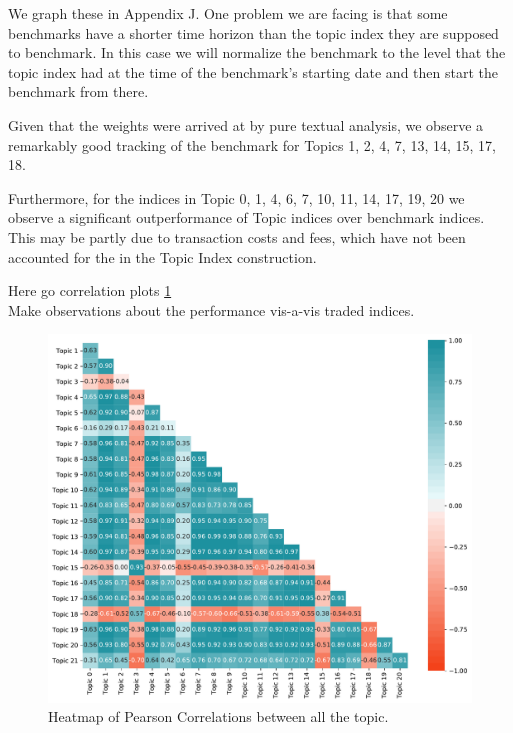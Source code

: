 \documentclass[12pt,journal,letterpaper,oneside,onecolumn]{IEEEtran}
\begin{document}
We graph these in Appendix J. One problem we are facing is that some benchmarks have a shorter time horizon than the topic index they are supposed to benchmark. In this case we will normalize the benchmark to the level that the topic index had at the time of the benchmark's starting date and then start the benchmark from there.

Given that the weights were arrived at by pure textual analysis, we observe a remarkably good tracking of the benchmark for Topics 1, 2, 4, 7, 13, 14, 15, 17, 18. 

Furthermore, for the indices in Topic 0, 1, 4, 6, 7, 10, 11, 14, 17, 19, 20 we observe a significant outperformance of Topic indices over benchmark indices. This may be partly due to transaction costs and fees, which have not been accounted for the in the Topic Index construction.

Here go correlation plots \ref{fig:correlation_dig_topics}\\

Make observations about the performance vis-a-vis traded indices.

\begin{figure}
    \centering
	\includegraphics[width=0.9\linewidth]{images/heat_map_correlation_diagonal_topics.pdf}
	\caption{Heatmap of Pearson Correlations between all the topic.}
	\label{fig:correlation_dig_topics}       
\end{figure}
\end{document}
